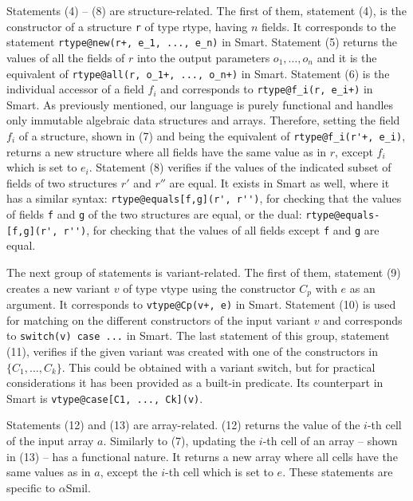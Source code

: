 \documentclass[11pt]{article}
\newcommand{\snumber}[1]{\textrm{{\scriptsize(#1)}}}
\def\slang{\textsf{Smart}}
\def\smil{\textsf{Smil}}
\newcommand{\disp}[1]{\lstinline&#1&}
\def\asmil{\textsf{$\alpha$Smil}}
\begin{document}
Statements \snumber{4} -- \snumber{8} are structure-related. The first of
them, statement \snumber{4}, is the constructor of a structure \disp{r} of type
\textsf{rtype}, having $n$ fields. It corresponds to the statement
\disp{rtype@new(r+, e_1, ..., e_n)} in {\slang}. Statement \snumber{5} returns 
the values of all the fields of $r$ into the output parameters $o_1, \ldots, o_n$ 
and it is the equivalent of \disp{rtype@all(r, o_1+, ..., o_n+)} in {\slang}. 
Statement \snumber{6} is the individual accessor of a field $f_i$ and corresponds 
to \disp{rtype@f_i(r, e_i+)} in {\slang}. As previously mentioned, our language is 
purely functional and handles only immutable algebraic data structures 
and arrays. Therefore, setting the field $f_i$ of a structure, shown in 
\snumber{7} and being the equivalent of \disp{rtype@f_i(r'+, e_i)}, returns a new 
structure where all fields have the same value as in $r$, except $f_i$ which is 
set to $e_i$. Statement \snumber{8} verifies if the values of the indicated 
subset of fields of two structures $r'$ and $r''$ are equal. It exists in 
{\slang} as well, where it has a similar syntax: \disp{rtype@equals[f,g](r', r'')}, 
for checking that the values of fields \disp{f} and \disp{g} of the two 
structures are equal, or the dual: \disp{rtype@equals-[f,g](r', r'')}, for 
checking that the values of all fields except \disp{f} and \disp{g} are equal. 

The next group of statements is variant-related. The first of them, statement
\snumber{9} creates a new variant $v$ of type \textsf{vtype} using the constructor 
$C_p$ with $e$ as an argument. It corresponds to \disp{vtype@Cp(v+, e)} in 
{\slang}. Statement \snumber{10} is used for matching on the different 
constructors of the input variant $v$ and corresponds to \disp{switch(v) case ...} 
in {\slang}. The last statement of this group, statement \snumber{11}, verifies 
if the given variant was created with one of the constructors in 
$\{C_1, \ldots, C_k\}$. This could be obtained with a variant switch, but for 
practical considerations it has been provided as a built-in predicate. Its 
counterpart in {\slang} is \disp{vtype@case[C1, ..., Ck](v)}.   

Statements \snumber{12} and \snumber{13} are array-related. \snumber{12} returns 
the value of the $i$-th cell of the input array $a$. Similarly to \snumber{7}, 
updating the $i$-th cell of an array -- shown in \snumber{13} --  has a functional 
nature. It returns a new array where all cells have the same values as in $a$,
except the $i$-th cell which is set to $e$. These statements are specific to 
{\asmil}.
\end{document}
